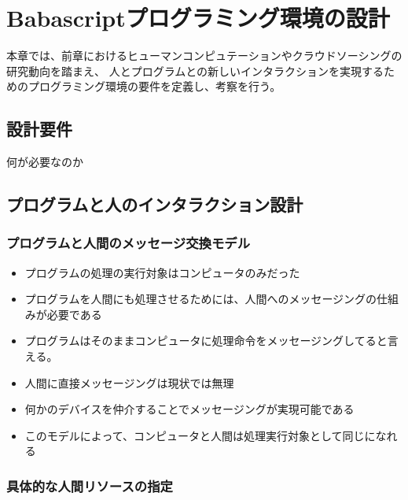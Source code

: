 \chapter{Babascriptプログラミング環境の設計}
\label{chap:design}

本章では、前章におけるヒューマンコンピュテーションやクラウドソーシングの研究動向を踏まえ、
人とプログラムとの新しいインタラクションを実現するためのプログラミング環境の要件を定義し、考察を行う。

\section{設計要件}\label{ux8a2dux8a08ux8981ux4ef6}

何が必要なのか

\section{プログラムと人のインタラクション設計}\label{ux30d7ux30edux30b0ux30e9ux30e0ux3068ux4ebaux306eux30a4ux30f3ux30bfux30e9ux30afux30b7ux30e7ux30f3ux8a2dux8a08}

\subsection{プログラムと人間のメッセージ交換モデル}\label{ux30d7ux30edux30b0ux30e9ux30e0ux3068ux4ebaux9593ux306eux30e1ux30c3ux30bbux30fcux30b8ux4ea4ux63dbux30e2ux30c7ux30eb}

\begin{itemize}
\itemsep1pt\parskip0pt
\item
  プログラムの処理の実行対象はコンピュータのみだった
\item
  プログラムを人間にも処理させるためには、人間へのメッセージングの仕組みが必要である
\item
  プログラムはそのままコンピュータに処理命令をメッセージングしてると言える。
\item
  人間に直接メッセージングは現状では無理
\item
  何かのデバイスを仲介することでメッセージングが実現可能である
\item
  このモデルによって、コンピュータと人間は処理実行対象として同じになれる
\end{itemize}

\subsection{具体的な人間リソースの指定}\label{ux5177ux4f53ux7684ux306aux4ebaux9593ux30eaux30bdux30fcux30b9ux306eux6307ux5b9a}

